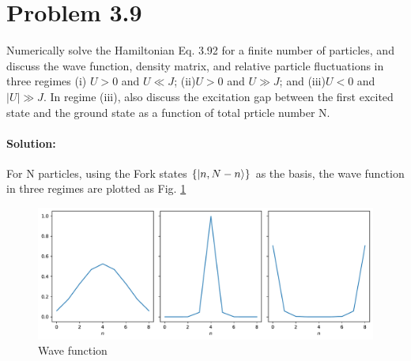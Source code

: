 \section*{Problem 3.9}
Numerically solve the Hamiltonian Eq. 3.92 for a finite number of particles, and discuss the wave function, density matrix, and relative particle fluctuations in three regimes (i) $U>0$ and $ U \ll J$; (ii)$U>0$ and $U \gg J$; and (iii)$U<0$ and $\left\lvert U\right\rvert \gg J$. In regime (iii), also discuss the excitation gap between the first excited state and the ground state as a function of total prticle number N.
\paragraph*{Solution:}
For N particles, using the Fork states $\left\{ \ket{n, N-n}\right\}$ as the basis, the wave function in three regimes are plotted as Fig. \ref{3.9 fig wf}

\begin{figure}[h]
    \centering
    \includegraphics[width=.8\textwidth]{wf.pdf}
    \caption{Wave function}
    \label{3.9 fig wf}
\end{figure}

